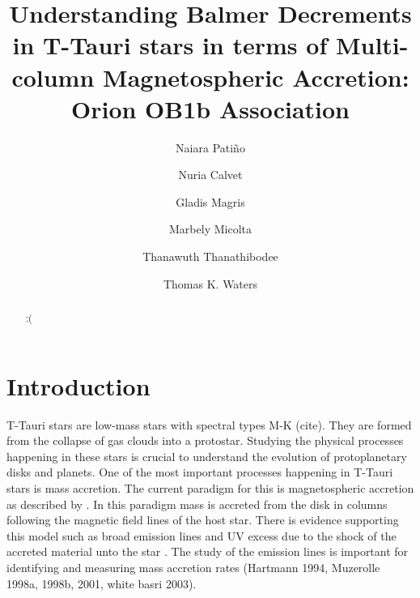 \documentclass[twocolumn,linenumbers]{aastex631}
\begin{document}
\title{Understanding Balmer Decrements in T-Tauri stars in terms of Multi-column Magnetospheric Accretion: Orion OB1b Association}


\author[0009-0009-7455-6777]{Naiara Patiño}

\author[0000-0002-3950-5386]{Nuria Calvet}

\author[0000-0000-0000-0000]{Gladis Magris}

\author[0000-0001-8022-4378]{Marbely Micolta}

\author[0000-0003-4507-1710]{Thanawuth Thanathibodee}

\author[0000-0002-5231-7240]{Thomas K. Waters}



\begin{abstract}

 :(
    
\end{abstract}


\section{Introduction}

T-Tauri stars are low-mass stars with spectral types M-K (cite). They are formed from the collapse of gas clouds into a protostar. Studying the physical processes happening in these stars is crucial to understand the evolution of protoplanetary disks and planets. One of the most important processes happening in T-Tauri stars is mass accretion. The current paradigm for this is magnetospheric accretion as described by \citep{hartmann2016}. In this paradigm mass is accreted from the disk in columns following the magnetic field lines of the host star. There is evidence supporting this model such as broad emission lines \citep{muzerolle2001} and UV excess due to the shock of the accreted material unto the star \citep{calvet_gullbring1998}. The study of the emission lines is important for identifying and measuring mass accretion rates (Hartmann 1994, Muzerolle 1998a, 1998b, 2001, white basri 2003).
\end{document}
